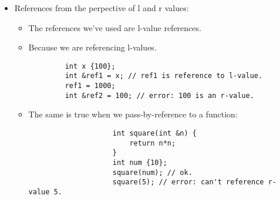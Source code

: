\begin{itemize}
    \item References from the perpective of l and r values:
        \begin{itemize}
            \item The references we've used are l-value references.
            \item Because we are referencing l-values.
        \end{itemize}
        \begin{verbatim}
            int x {100};
            int &ref1 = x; // ref1 is reference to l-value.
            ref1 = 1000;
            int &ref2 = 100; // error: 100 is an r-value.
        \end{verbatim}
        \begin{itemize}
            \item The same is true when we pass-by-reference to a function:
                \begin{verbatim}
                    int square(int &n) {
                        return n*n;
                    }
                    int num {10};
                    square(num); // ok.
                    square(5); // error: can't reference r-value 5.
                \end{verbatim}
        \end{itemize}
\end{itemize}


\section{}
